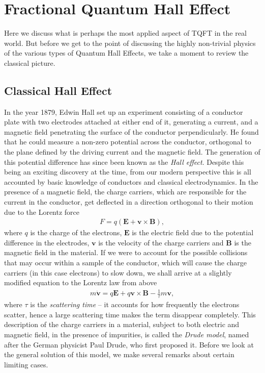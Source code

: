         \section{Fractional Quantum Hall Effect} \label{FQHE_sec}
        Here we discuss what is perhaps the most applied aspect of TQFT in the real world. But before we get to the point of discussing the highly non-trivial physics of the various types of Quantum Hall Effects, we take a moment to review the classical picture.
        \subsection{Classical Hall Effect}
        In the year 1879, Edwin Hall set up an experiment consisting of a conductor plate with two electrodes attached at either end of it, generating a current, and a magnetic field penetrating the surface of the conductor perpendicularly. He found that he could measure a non-zero potential across the conductor, orthogonal to the plane defined by the driving current and the magnetic field. The generation of this potential difference has since been known as the \textit{Hall effect}. Despite this being an exciting discovery at the time, from our modern perspective this is all accounted by basic knowledge of conductors and classical electrodynamics. In the presence of a magnetic field, the charge carriers, which are responsible for the current in the conductor, get deflected in a direction orthogonal to their motion due to the Lorentz force
        \begin{align}
            F = q(\bm{E} + \bm{v}\times \bm{B}),
        \end{align}
        where $q$ is the charge of the electrons, $\bm{E}$ is the electric field due to the potential difference in the electrodes, $\bm{v}$ is the velocity of the charge carriers and $\bm{B}$ is the magnetic field in the material. If we were to account for the possible collisions that may occur within a sample of the conductor, which will cause the charge carriers (in this case electrons) to slow down, we shall arrive at a slightly modified equation to the Lorentz law from above
        \begin{align}
            m \dot{\bm{v}} = q \bm{E}+q \bm{v}\times \bm{B} - \frac{1}{\tau} m \bm{v}, \label{eq:Drude_Model_Background}
        \end{align}
        where $\tau$ is the \textit{scattering time} -- it accounts for how frequently the electrons scatter, hence a large scattering time makes the term disappear completely. This description of the charge carriers in a material, subject to both electric and magnetic field, in the presence of impurities, is called the \textit{Drude model}, named after the German physicist Paul Drude, who first proposed it. Before we look at the general solution of this model, we make several remarks about certain limiting cases.\\
